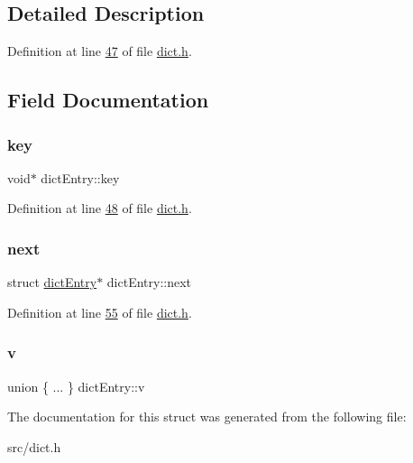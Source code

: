 \subsection{Detailed Description}


Definition at line \hyperlink{dict_8h_source_l00047}{47} of file \hyperlink{dict_8h_source}{dict.\+h}.



\subsection{Field Documentation}
\mbox{\label{structdictEntry_a1cc436243330e4ac0a1d7d07e5a16ce0}} 
\subsubsection{\texorpdfstring{key}{key}}
{\footnotesize\ttfamily void$\ast$ dict\+Entry\+::key}



Definition at line \hyperlink{dict_8h_source_l00048}{48} of file \hyperlink{dict_8h_source}{dict.\+h}.

\mbox{\label{structdictEntry_ae3d8892babea304bd7e2aded824586dd}} 
\subsubsection{\texorpdfstring{next}{next}}
{\footnotesize\ttfamily struct \hyperlink{structdictEntry}{dict\+Entry}$\ast$ dict\+Entry\+::next}



Definition at line \hyperlink{dict_8h_source_l00055}{55} of file \hyperlink{dict_8h_source}{dict.\+h}.

\mbox{\label{structdictEntry_aab34aa7e370a74652ef12d42b96a44d9}} 
\subsubsection{\texorpdfstring{v}{v}}
{\footnotesize\ttfamily union \{ ... \}   dict\+Entry\+::v}



The documentation for this struct was generated from the following file\+:\begin{DoxyCompactItemize}
\item 
src/dict.\+h\end{DoxyCompactItemize}
